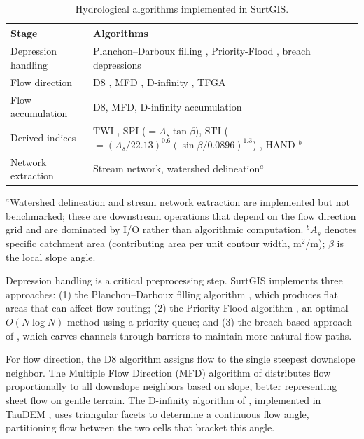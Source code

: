 \documentclass[preprint,review,12pt,authoryear]{elsarticle}
\begin{document}
\begin{table}[htbp]
\centering
\caption{Hydrological algorithms implemented in SurtGIS.}
\label{tab:hydrology}
\begin{tabular}{@{}lp{9cm}@{}}
\toprule
Stage & Algorithms \\
\midrule
Depression handling & Planchon--Darboux filling \citep{planchon2001}, Priority-Flood \citep{barnes2014}, breach depressions \citep{lindsay2016} \\
Flow direction & D8 \citep{ocallaghan1984}, MFD \citep{quinn1991}, D-infinity \citep{tarboton1997}, TFGA \citep{li2024tfga} \\
Flow accumulation & D8, MFD, D-infinity accumulation \\
Derived indices & TWI \citep{kopecky2021}, SPI ($= A_s \tan\beta$), STI ($= (A_s/22.13)^{0.6} (\sin\beta/0.0896)^{1.3}$) \citep{wilson2000terrain}, HAND \citep{nobre2011}$^{b}$ \\
Network extraction & Stream network, watershed delineation$^{a}$ \\
\bottomrule
\end{tabular}
\smallskip

{\footnotesize $^{a}$Watershed delineation and stream network extraction are implemented but not benchmarked; these are downstream operations that depend on the flow direction grid and are dominated by I/O rather than algorithmic computation. $^{b}$$A_s$ denotes specific catchment area (contributing area per unit contour width, m$^2$/m); $\beta$ is the local slope angle.}
\end{table}

Depression handling is a critical preprocessing step. SurtGIS implements three approaches: (1) the Planchon--Darboux filling algorithm \citep{planchon2001}, which produces flat areas that can affect flow routing; (2) the Priority-Flood algorithm \citep{barnes2014}, an optimal $O(N \log N)$ method using a priority queue; and (3) the breach-based approach of \citet{lindsay2016}, which carves channels through barriers to maintain more natural flow paths.

For flow direction, the D8 algorithm \citep{ocallaghan1984} assigns flow to the single steepest downslope neighbor. The Multiple Flow Direction (MFD) algorithm of \citet{quinn1991} distributes flow proportionally to all downslope neighbors based on slope, better representing sheet flow on gentle terrain. The D-infinity algorithm of \citet{tarboton1997}, implemented in TauDEM \citep{tarboton2015taudem}, uses triangular facets to determine a continuous flow angle, partitioning flow between the two cells that bracket this angle.
\end{document}
